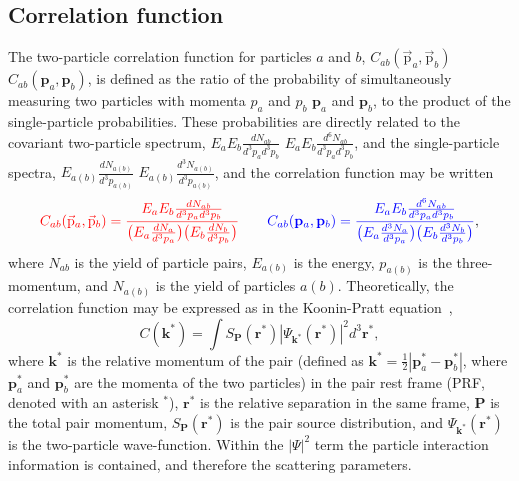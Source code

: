 \documentclass[ALICE,manyauthors]{cernphprep}
\begin{document}
\subsection{Correlation function}
\label{sec:CorrelationFunction}
The two-particle correlation function for particles $a$ and $b$, {\color{red}$C_{ab}(\vec{\mathrm{p}}_{a},\vec{\mathrm{p}}_{b})$} {\color{blue}$C_{ab}(\mathbf{p}_{a},\mathbf{p}_{b})$}, is defined as the ratio of the probability of simultaneously measuring two particles with momenta {\color{red}$p_{a}$ and $p_{b}$} {\color{blue}$\mathbf{p}_{a}$ and $\mathbf{p}_{b}$}, to the product of the single-particle probabilities.
These probabilities are directly related to the covariant two-particle spectrum, {\color{red}$E_{a}E_{b}\frac{dN_{ab}}{d^{3}p_{a}d^{3}p_{b}}$} {\color{blue}$E_{a}E_{b}\frac{d^{6}N_{ab}}{d^{3}p_{a}d^{3}p_{b}}$}, and the single-particle spectra, {\color{red}$E_{a(b)}\frac{dN_{a(b)}}{d^{3}p_{a(b)}}$} {\color{blue}$E_{a(b)}\frac{d^{3}N_{a(b)}}{d^{3}p_{a(b)}}$}, and the correlation function may be written
\begin{equation}
  {\color{red}C_{ab}(\vec{\mathrm{p}}_{a},\vec{\mathrm{p}}_{b}) = \frac{E_{a}E_{b}\frac{dN_{ab}}{d^{3}p_{a}d^{3}p_{b}}}{\big( E_{a}\frac{dN_{a}}{d^{3}p_{a}} \big) \big( E_{b}\frac{dN_{b}}{d^{3}p_{b}} \big)}}\qquad
  {\color{blue}C_{ab}(\mathbf{p}_{a},\mathbf{p}_{b}) = \frac{E_{a}E_{b}\frac{d^{6}N_{ab}}{d^{3}p_{a}d^{3}p_{b}}}{\big( E_{a}\frac{d^{3}N_{a}}{d^{3}p_{a}} \big) \big( E_{b}\frac{d^{3}N_{b}}{d^{3}p_{b}} \big)}},
\label{eqn:CfRatioSpectra}
\end{equation}
where $N_{ab}$ is the yield of particle pairs, $E_{a(b)}$ is the energy, $p_{a(b)}$ is the three-momentum, and $N_{a(b)}$ is the yield of particles $a(b)$.
Theoretically, the correlation function may be expressed as in the Koonin-Pratt equation~\cite{Koonin:1977fh, Pratt:1990zq},
\begin{equation}
 C(\mathbf{k^{*}}) = \int S_{\mathbf{P}}(\mathbf{r^{*}})|\Psi_{\mathbf{k^{*}}}(\mathbf{r^{*}})|^{2}d^{3}\mathbf{r^{*}},
\label{eqn:KooninPrattEqn}
\end{equation}
where $\mathbf{k}^{*}$ is the relative momentum of the pair (defined as $\mathbf{k}^{*} = \frac{1}{2}|\mathbf{p}_{a}^{*}-\mathbf{p}_{b}^{*}|$, where $\mathbf{p}_{a}^{*}$ and $\mathbf{p}_{b}^{*}$ are the momenta of the two particles) in the pair rest frame (PRF{\color{blue}, denoted with an asterisk $^{*}$}), $\mathbf{r}^{*}$ is the relative separation in the same frame, $\mathbf{P}$ is the total pair momentum, $S_{\mathbf{P}}(\mathbf{r^{*}})$ is the pair source distribution, and $\Psi_{\mathbf{k^{*}}}(\mathbf{r^{*}})$ is the two-particle wave-function.
{\color{red}Within the $|\Psi|^{2}$ term the particle interaction information is contained, and therefore the scattering parameters.}
\end{document}
